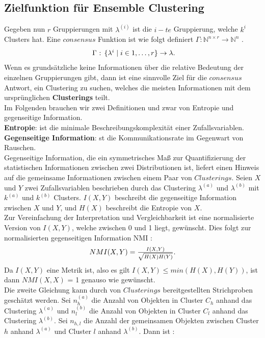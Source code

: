 \documentclass[runningheads]{llncs}
\begin{document}
\subsection{Zielfunktion für Ensemble Clustering}
Gegeben nun $r$ Gruppierungen mit $\lambda^{(i)}$ ist die $i-te$ Gruppierung, welche $k^{i}$ Clusters hat. Eine $consensus$ Funktion ist wie folgt definiert $\Gamma:\mathbb{N}^{n \times r} \rightarrow \mathbb{N}^{n}$ \cite{strehl2002cluster}.
\begin{equation} 
\centerline{ $\Gamma$ : $\{\lambda^{i} \mid i \in {1, \ldots, r}\} \rightarrow \lambda$.}
\end{equation}
Wenn es grundsätzliche keine Informationen über die relative Bedeutung der einzelnen Gruppierungen gibt, dann ist eine sinnvolle Ziel für die $consensus$ Antwort, ein Clustering zu suchen, welches die meisten Informationen mit dem ursprünglichen \textbf{Clusterings} teilt.  \\
Im Folgenden brauchen wir zwei Definitionen und zwar von Entropie und gegenseitige Information.\\
\textbf{Entropie}: ist die minimale Beschreibungskomplexität einer Zufallsvariablen.\\
\textbf{Gegenseitige Information}: st die Kommunikationsrate im Gegenwart von Rauschen.\\
Gegenseitige Information, die ein symmetrisches Maß zur Quantifizierung der statistischen Informationen zwischen zwei Distributionen ist, liefert einen Hinweis auf die gemeinsame Informationen zwischen einem Paar von $Clusterings$. Seien $X$ und $Y$ zwei Zufallsvariablen beschrieben durch das Clustering $\lambda^{(a)}$ und $\lambda^{(b)}$ mit $k^{(a)}$ und $k^{(b)}$ Clusters. $I(X,Y)$ beschreibt die gegenseitige Information zwischen $X$ und $Y$, und $H(X)$ beschreibt die Entropie von $X$.\\
Zur Vereinfachung der Interpretation und Vergleichbarkeit ist eine normalisierte Version von $I(X,Y)$, welche zwischen 0 und 1 liegt, gewünscht. Dies folgt zur normalisierten gegenseitigen Information NMI \cite{strehl2002cluster}:
\begin{equation} 
\centerline{$NMI(X,Y) = \frac{I(X,Y)}{\sqrt{H(X)H(Y)}}.$}
\end{equation}
Da $I(X,Y)$ eine Metrik ist, also es gilt $I(X,Y) \leq min(H(X), H(Y))$, ist dann $NMI(X,X)$ = 1 genauso wie gewünscht.\\
Die zweite Gleichung kann durch von $Clusterings$ bereitgestellten Strichproben geschätzt werden. Sei $n_{h}^{(a)}$ die Anzahl von Objekten in Cluster $C_{h}$ anhand das Clustering $\lambda^{(a)}$ und $n_{l}^{(b)}$ die Anzahl von Objekten in Cluster $C_{l}$ anhand das Clustering $\lambda^{(b)}$. Sei $n_{h,l}$ die Anzahl der gemeinsamen Objekten zwischen Cluster $h$ anhand $\lambda^{(a)}$ und Cluster $l$ anhand $\lambda^{(b)}$. Dann ist \cite{strehl2002cluster}:
\end{document}
